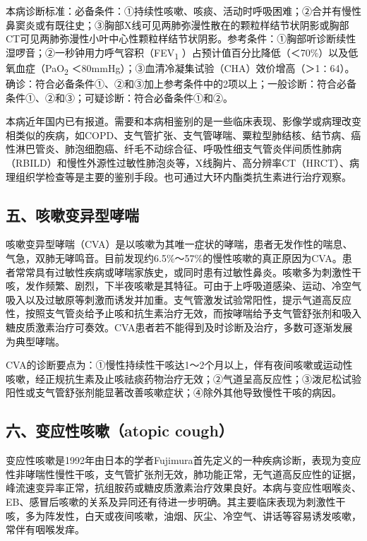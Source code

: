 本病诊断标准：必备条件：①持续性咳嗽、咳痰、活动时呼吸困难；②合并有慢性鼻窦炎或有既往史；③胸部X线可见两肺弥漫性散在的颗粒样结节状阴影或胸部CT可见两肺弥漫性小叶中心性颗粒样结节状阴影。参考条件：①胸部听诊断续性湿啰音；②一秒钟用力呼气容积（FEV\textsubscript{1}
）占预计值百分比降低（＜70\%）以及低氧血症（PaO\textsubscript{2}
＜80mmHg）；③血清冷凝集试验（CHA）效价增高（＞1∶64）。确诊：符合必备条件①、②和③加上参考条件中的2项以上；一般诊断：符合必备条件①、②和③；可疑诊断：符合必备条件①和②。

本病近年国内已有报道。需要和本病相鉴别的是一些临床表现、影像学或病理改变相类似的疾病，如COPD、支气管扩张、支气管哮喘、粟粒型肺结核、结节病、癌性淋巴管炎、肺泡细胞癌、纤毛不动综合征、呼吸性细支气管炎伴间质性肺病（RBILD）和慢性外源性过敏性肺泡炎等，X线胸片、高分辨率CT（HRCT）、病理组织学检查等是主要的鉴别手段。也可通过大环内酯类抗生素进行治疗观察。

\subsection{五、咳嗽变异型哮喘}

咳嗽变异型哮喘（CVA）是以咳嗽为其唯一症状的哮喘，患者无发作性的喘息、气急，双肺无哮鸣音。目前发现约6.5\%～57\%的慢性咳嗽的真正原因为CVA。患者常常具有过敏性疾病或哮喘家族史，或同时患有过敏性鼻炎。咳嗽多为刺激性干咳，发作频繁、剧烈，下半夜咳嗽是其特征。可由于上呼吸道感染、运动、冷空气吸入以及过敏原等刺激而诱发并加重。支气管激发试验常阳性，提示气道高反应性，按照支气管炎给予止咳和抗生素治疗无效，而按哮喘给予支气管舒张剂和吸入糖皮质激素治疗可奏效。CVA患者若不能得到及时诊断及治疗，多数可逐渐发展为典型哮喘。

CVA的诊断要点为：①慢性持续性干咳达1～2个月以上，伴有夜间咳嗽或运动性咳嗽，经正规抗生素及止咳祛痰药物治疗无效；②气道呈高反应性；③泼尼松试验阳性或支气管舒张剂能显著改善咳嗽症状；④除外其他导致慢性干咳的病因。

\subsection{六、变应性咳嗽（atopic cough）}

变应性咳嗽是1992年由日本的学者Fujimura首先定义的一种疾病诊断，表现为变应性非哮喘性慢性干咳，支气管扩张剂无效，肺功能正常，无气道高反应性的证据，峰流速变异率正常，抗组胺药或糖皮质激素治疗效果良好。本病与变应性咽喉炎、EB、感冒后咳嗽的关系及异同还有待进一步明确。其主要临床表现为刺激性干咳，多为阵发性，白天或夜间咳嗽，油烟、灰尘、冷空气、讲话等容易诱发咳嗽，常伴有咽喉发痒。

